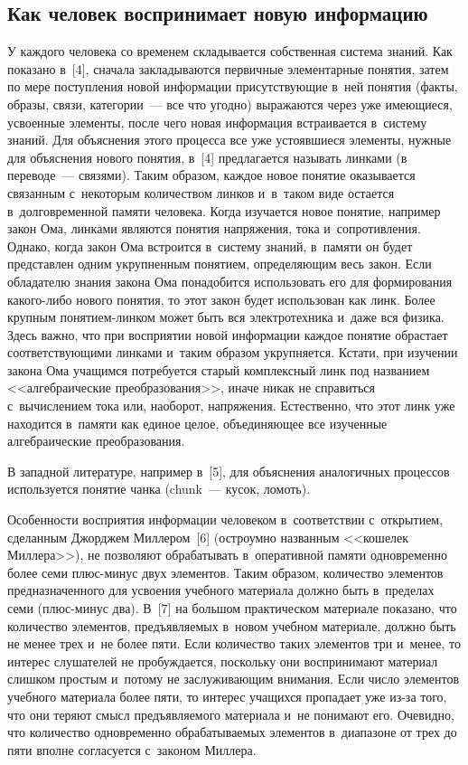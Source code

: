\begin{multicols}{2}
\section{Как человек воспринимает новую информацию}

  У каждого человека со временем складывается собственная система знаний. 
Как показано в~[4], сначала закладываются первичные элементарные понятия, 
затем по мере поступления новой информации присутствующие в~ней понятия 
(факты, образы, связи, категории~--- все что угодно) выражаются через уже 
имеющиеся, усвоенные элементы, после чего новая информация встраивается 
в~сис\-те\-му знаний. Для объяснения этого процесса все уже устоявшиеся 
элементы, нужные для объяснения нового понятия, в~[4] предлагается называть 
линками (в переводе~--- связями). Таким образом, каждое новое понятие 
оказывается связанным с~некоторым количеством линков и~в~таком виде 
остается в~долговременной памяти человека. Когда изучается новое понятие, 
например закон Ома, линками являются понятия напряжения, тока 
и~сопротивления. Однако, когда закон Ома встроится в~сис\-те\-му знаний, 
в~памяти он будет представлен одним укрупненным понятием, определяющим 
весь закон. Если обладателю знания закона Ома понадобится использовать его 
для формирования ка\-ко\-го-ли\-бо нового понятия, то этот закон будет 
использован как линк. Более крупным по\-ня\-ти\-ем-лин\-ком может быть вся 
электротехника и~даже вся физика. Здесь важно, что при восприятии новой 
информации каждое понятие обрастает соответствующими линками и~таким 
образом укрупняется. Кстати, при изучении закона Ома учащимся потребуется 
старый комплексный линк под названием <<алгебраические преобразования>>, 
иначе никак не справиться с~вычислением тока или, наоборот, напряжения. 
Естественно, что этот линк уже находится в~памяти как единое целое, 
объединяющее все изученные ал\-геб\-ра\-и\-че\-ские преобразования.
  
  В западной литературе, например в~[5], для объяснения аналогичных 
процессов используется понятие чанка (chunk~--- кусок, ломоть). 
  
  Особенности восприятия информации человеком в~соответствии 
с~открытием, сделанным Джорджем Миллером~[6] (остроумно названным 
<<кошелек Миллера>>), не позволяют обрабатывать в~оператив\-ной памяти 
одновременно более семи плюс-ми\-нус двух элементов. Таким образом, 
количество элементов предназначенного для усвоения учебного материала 
должно быть в~пределах семи (плюс-ми\-нус два). В~[7] на большом 
практическом материале показано, что количество элементов, предъявляемых 
в~новом учебном материале, должно быть не менее трех и~не более пяти. Если 
количество таких элементов три и~менее, то интерес слушателей не 
пробуждается, поскольку они воспринимают материал слишком простым 
и~потому не заслуживающим внимания. Если число элементов учебного 
материала более пяти, то интерес учащихся пропадает уже из-за того, что они 
теряют смысл предъявляемого материала и~не понимают его. Очевидно, что 
количество одновременно обрабатываемых элементов в~диапазоне от трех до 
пяти вполне согласуется с~законом Миллера.
  

\end{multicols}
